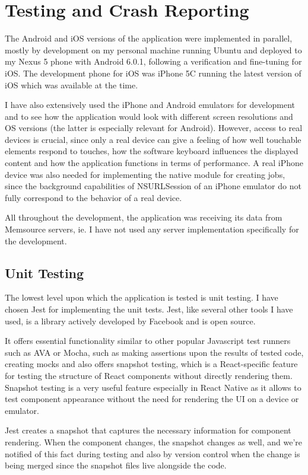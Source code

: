 \chapter{Testing and Crash Reporting}

The Android and iOS versions of the application were implemented in parallel, mostly by development on my personal machine running Ubuntu and deployed to my Nexus 5 phone with Android 6.0.1, following a verification and fine-tuning for iOS. The development phone for iOS was iPhone 5C running the latest version of iOS which was available at the time. 

I have also extensively used the iPhone and Android emulators for development and to see how the application would look with different screen resolutions and OS versions (the latter is especially relevant for Android). However, access to real devices is crucial, since only a real device can give a feeling of how well touchable elements respond to touches, how the software keyboard influences the displayed content and how the application functions in terms of performance. A real iPhone device was also needed for implementing the native module for creating jobs, since the background capabilities of NSURLSession of an iPhone emulator do not fully correspond to the behavior of a real device.

All throughout the development, the application was receiving its data from Memsource servers, ie. I have not used any server implementation specifically for the development.


\section{Unit Testing}
The lowest level upon which the application is tested is unit testing. I have chosen Jest for implementing the unit tests. Jest, like several other tools I have used, is a library actively developed by Facebook and is open source. 

It offers essential functionality similar to other popular Javascript test runners such as AVA or Mocha, such as making assertions upon the results of tested code, creating mocks and also offers snapshot testing, which is a React-specific feature for testing the structure of React components without directly rendering them. Snapshot testing is a very useful feature especially in React Native as it allows to test component appearance without the need for rendering the UI on a device or emulator. 

Jest creates a snapshot that captures the necessary information for component rendering. When the component changes, the snapshot changes as well, and we're notified of this fact during testing and also by version control when the change is being merged since the snapshot files live alongside the code. 

